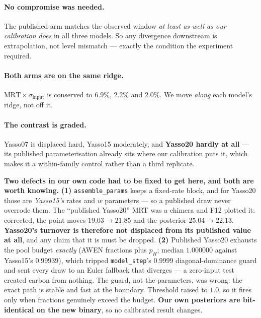 \documentclass[11pt]{article}
\newcommand{\sinput}{\sigma_{\mathrm{input}}}
\begin{document}
\paragraph{No compromise was needed.} The published arm matches the observed window \emph{at least
as well as our calibration does} in all three models. So any divergence downstream is extrapolation,
not level mismatch --- exactly the condition the experiment required.

\paragraph{Both arms are on the same ridge.} $\mathrm{MRT} \times \sinput$ is conserved to
$6.9\%$, $2.2\%$ and $2.0\%$. We move \emph{along} each model's ridge, not off it.

\paragraph{The contrast is graded.} Yasso07 is displaced hard, Yasso15 moderately, and
\textbf{Yasso20 hardly at all} --- its published parameterisation already sits where our calibration
puts it, which makes it a within-family control rather than a third replicate.

\begin{note}
\textbf{Two defects in our own code had to be fixed to get here, and both are worth knowing.}
\textbf{(1)} \texttt{assemble\_params} keeps a fixed-rate block, and for Yasso20 those are
\emph{Yasso15's} rates and $w$ parameters --- so a published draw never overrode them. The
``published Yasso20'' MRT was a chimera and F12 plotted it: corrected, the point moves
$19.03 \to 21.85$ and the posterior $25.04 \to 22.13$. \textbf{Yasso20's turnover is therefore not
displaced from its published value at all}, and any claim that it is must be dropped.
\textbf{(2)} Published Yasso20 exhausts the pool budget \emph{exactly} (AWEN fractions plus $p_H$;
median $1.000000$ against Yasso15's $0.99939$), which tripped \texttt{model\_step}'s $0.9999$
diagonal-dominance guard and sent every draw to an Euler fallback that diverges --- a zero-input test
created carbon from nothing. The guard, not the parameters, was wrong: the exact path is stable and
fast at the boundary. Threshold raised to $1.0$, so it fires only when fractions genuinely exceed the
budget. \textbf{Our own posteriors are bit-identical on the new binary}, so no calibrated result
changes.
\end{note}
\end{document}
